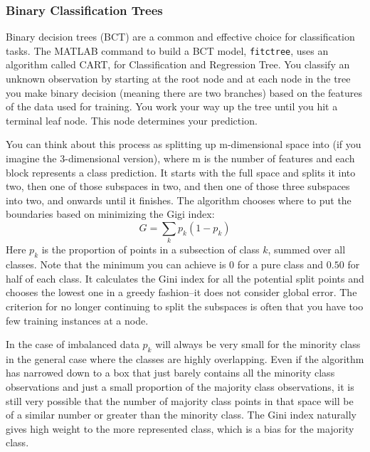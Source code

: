 \documentclass{article}
\begin{document}
\subsubsection{Binary Classification Trees}

Binary decision trees (BCT) are a common and effective choice for classification tasks.
The MATLAB command to build a BCT model, \texttt{fitctree}, uses an algorithm called CART, for Classification and Regression Tree. You classify an unknown observation by starting at the root node and at each node in the tree you make binary decision (meaning there are two branches) based on the features of the data used for training. You work your way up the tree until you hit a terminal leaf node. This node determines your prediction.

You can think about this process as splitting up m-dimensional space into  (if you imagine the 3-dimensional version), where m is the number of features and each block represents a class prediction. It starts with the full space and splits it into two, then one of those subspaces in two, and then one of those three subspaces into two, and onwards until it finishes.
The algorithm chooses where to put the boundaries based on minimizing the Gigi index:
\begin{equation}
G={\textstyle \sum_{k}p_{k}(1-p_{k})}
\end{equation}
Here $p_k$ is the proportion of points in a subsection of class $k$, summed over all classes.
Note that the minimum you can achieve is 0 for a pure class and $0.50$ for half of each class. It calculates the Gini index for all the potential split points and chooses the lowest one in a greedy fashion--it does not consider global error. The criterion for no longer continuing to split the subspaces is often that you have too few training instances at a node.

In the case of imbalanced data $p_k$ will always be very small for the minority class in the general case where the classes are highly overlapping. Even if the algorithm has narrowed down to a box that just barely contains all the minority class observations and just a small proportion of the majority class observations, it is still very possible that the number of majority class points in that space will be of a similar number or greater than the minority class. The Gini index naturally gives high weight to the more represented class, which is a bias for the majority class.
\end{document}
